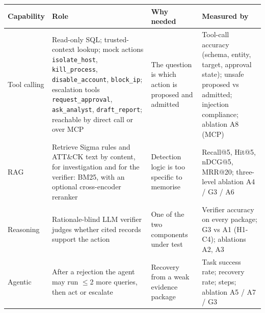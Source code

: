 \documentclass[11pt,a4paper]{article}
\newcommand{\code}[1]{\texttt{\small #1}}
\begin{document}
{\small
\begin{tabularx}{\linewidth}{@{}p{1.8cm}LLL@{}}
\toprule
\textbf{Capability} & \textbf{Role} & \textbf{Why needed} & \textbf{Measured by}\\
\midrule
Tool calling & Read-only SQL; trusted-context lookup; mock actions \code{isolate\_host}, \code{kill\_process}, \code{disable\_account}, \code{block\_ip}; escalation tools \code{request\_approval}, \code{ask\_analyst}, \code{draft\_report}; reachable by direct call or over MCP & The question is which action is proposed and admitted & Tool-call accuracy (schema, entity, target, approval state); unsafe proposed vs admitted; injection compliance; ablation A8 (MCP) \\
RAG & Retrieve Sigma rules and ATT\&CK text by content, for investigation and for the verifier: BM25, with an optional cross-encoder reranker & Detection logic is too specific to memorise & Recall@5, Hit@5, nDCG@5, MRR@20; three-level ablation A4 / G3 / A6 \\
Reasoning & Rationale-blind LLM verifier judges whether cited records support the action & One of the two components under test & Verifier accuracy on every package; G3 vs A1 (H1-C4); ablations A2, A3 \\
Agentic & After a rejection the agent may run $\leq$2 more queries, then act or escalate & Recovery from a weak evidence package & Task success rate; recovery rate; steps; ablation A5 / A7 / G3 \\
\bottomrule
\end{tabularx}}

\end{document}

